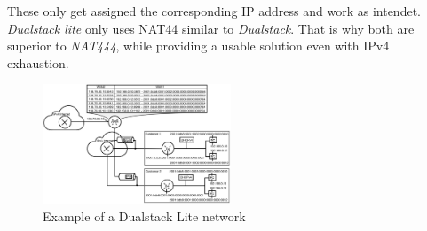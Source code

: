 \documentclass[format=sigconf, natbib=true, nonacm=true]{acmart}
\begin{document}
These only get assigned the corresponding IP address and work as intendet. \textit{Dualstack lite} only uses NAT44 similar to \textit{Dualstack}. That is why both are superior to \textit{NAT444}, while providing a usable solution even with IPv4 exhaustion.
    \begin{figure}
        \centering
        \includegraphics[width=0.5\textwidth]{images/dualstack_lite_network.png}
        \caption{Example of a Dualstack Lite network}
        \label{fig:dualstack_lite_network}
    \end{figure}
\end{document}
